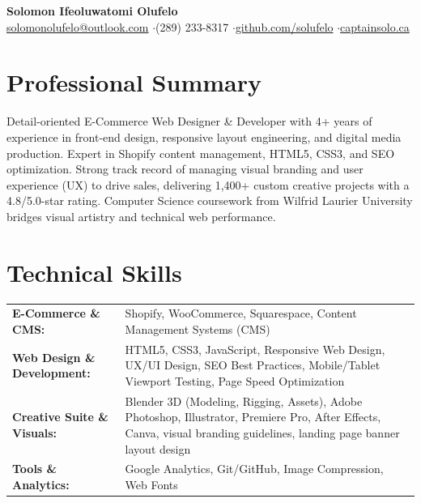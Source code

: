 \documentclass[a4paper,10pt]{article}
\begin{document}
\begin{center}
    {\LARGE \textbf{Solomon Ifeoluwatomi Olufelo}} \\[2pt]
    \href{mailto:solomonolufelo@outlook.com}{solomonolufelo@outlook.com} \enspace$\cdot$\enspace (289) 233-8317 \enspace$\cdot$\enspace \href{https://github.com/solufelo}{github.com/solufelo} \enspace$\cdot$\enspace \href{https://captainsolo.ca}{captainsolo.ca}
\end{center}

\section*{Professional Summary}
Detail-oriented E-Commerce Web Designer \& Developer with 4+ years of experience in front-end design, responsive layout engineering, and digital media production. Expert in Shopify content management, HTML5, CSS3, and SEO optimization. Strong track record of managing visual branding and user experience (UX) to drive sales, delivering 1,400+ custom creative projects with a 4.8/5.0-star rating. Computer Science coursework from Wilfrid Laurier University bridges visual artistry and technical web performance.

\section*{Technical Skills}
\begin{tabularx}{\textwidth}{@{}lX@{}}
\textbf{E-Commerce \& CMS:} & Shopify, WooCommerce, Squarespace, Content Management Systems (CMS) \\
\textbf{Web Design \& Development:} & HTML5, CSS3, JavaScript, Responsive Web Design, UX/UI Design, SEO Best Practices, Mobile/Tablet Viewport Testing, Page Speed Optimization \\
\textbf{Creative Suite \& Visuals:} & Blender 3D (Modeling, Rigging, Assets), Adobe Photoshop, Illustrator, Premiere Pro, After Effects, Canva, visual branding guidelines, landing page banner layout design \\
\textbf{Tools \& Analytics:} & Google Analytics, Git/GitHub, Image Compression, Web Fonts \\
\end{tabularx}
\end{document}
